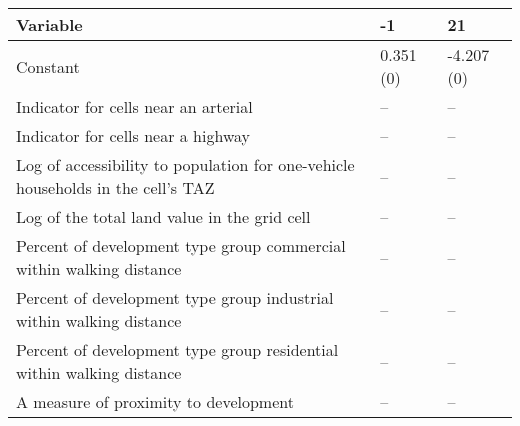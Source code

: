 
\begin{tabular}{p{3in}p{0.5in}p{0.5in}}
\hline\hline
Variable & -1 & 21 \\\hline
Constant & 0.351 (0) & -4.207 (0) \\
Indicator for cells near an arterial & -- & -- \\
Indicator for cells near a highway & -- & -- \\
Log of accessibility to population for one-vehicle households in the cell's TAZ & -- & -- \\
Log of the total land value in the grid cell & -- & -- \\
Percent of development type group commercial within walking distance & -- & -- \\
Percent of development type group industrial within walking distance & -- & -- \\
Percent of development type group residential within walking distance & -- & -- \\
A measure of proximity to development & -- & -- \\
\hline\hline
\end{tabular}
